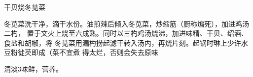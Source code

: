 \begin{recipe}{干贝烧冬苋菜}

\ingredients


\cooking

冬苋菜洗干净，滴干水份。油煎辣后倾入冬苋菜，炒缩筋（厨称煸死），加进鸡汤二杓，
置于文火上烧至六成熟。同时以三杓鸡汤烧沸，加进味精、干贝、绍酒、食盐和胡椒，将
冬苋菜用漏杓捞起滤干转入汤内，再烧片刻。起锅时琳上少许水豆粉徙芡即成（菜不宜煮
得太烂，否则会失去原味

\notes

清淡3味鲜，营养。

\end{recipe}

